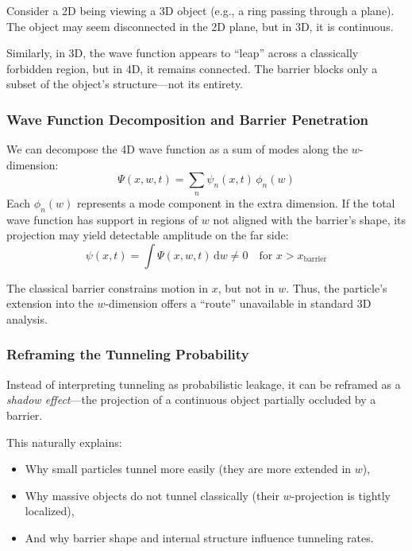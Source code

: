 \documentclass[12pt]{article}
\begin{document}
Consider a 2D being viewing a 3D object (e.g., a ring passing through a plane). The object may seem disconnected in the 2D plane, but in 3D, it is continuous.

Similarly, in 3D, the wave function appears to “leap” across a classically forbidden region, but in 4D, it remains connected. The barrier blocks only a subset of the object’s structure—not its entirety.

\subsubsection{Wave Function Decomposition and Barrier Penetration}

We can decompose the 4D wave function as a sum of modes along the \( w \)-dimension:
\begin{equation}
\Psi(x, w, t) = \sum_n \psi_n(x, t) \, \phi_n(w)
\end{equation}
Each \( \phi_n(w) \) represents a mode component in the extra dimension. If the total wave function has support in regions of \( w \) not aligned with the barrier’s shape, its projection may yield detectable amplitude on the far side:
\begin{equation}
\psi(x, t) = \int \Psi(x, w, t) \, \mathrm{d}w \neq 0 \quad \text{for } x > x_{\text{barrier}}
\end{equation}

The classical barrier constrains motion in \( x \), but not in \( w \). Thus, the particle's extension into the \( w \)-dimension offers a “route” unavailable in standard 3D analysis.

\subsubsection{Reframing the Tunneling Probability}

Instead of interpreting tunneling as probabilistic leakage, it can be reframed as a \emph{shadow effect}—the projection of a continuous object partially occluded by a barrier.

This naturally explains:
\begin{itemize}
  \item Why small particles tunnel more easily (they are more extended in \( w \)),
  \item Why massive objects do not tunnel classically (their \( w \)-projection is tightly localized),
  \item And why barrier shape and internal structure influence tunneling rates.
\end{itemize}
\end{document}
